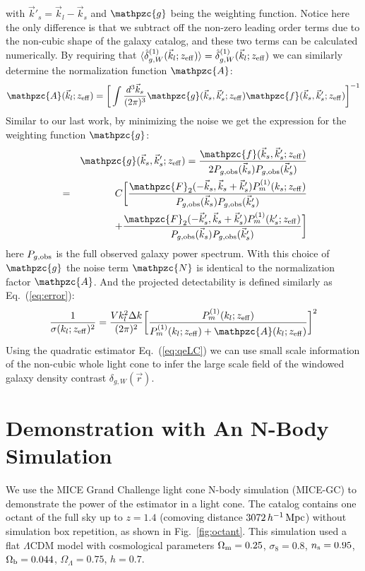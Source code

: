 \documentclass[prd,amsmath,amssymb,floatfix,superscriptaddress,nofootinbib,twocolumn]{revtex4-1}
\newcommand{\vrr}{\vec{r}}
\newcommand{\vs}{\nonumber\\}
\newcommand{\ec}[1]{Eq.~(\ref{eq:#1})}
\newcommand{\rf}[1]{\ref{fig:#1}}
\begin{document}
with $\vec{k}'_s = \vec{k}_l-\vec{k}_s$ and $\mathpzc{g}$ being the weighting function. Notice here the only difference is that we subtract off the non-zero leading order terms due to the non-cubic shape of the galaxy catalog, and these two terms can be calculated numerically. By requiring that $\langle \hat{\delta}^{(1)}_{g,W}(\vec{k}_l;z_{\rm eff})\rangle = \hat{\delta}^{(1)}_{g,W}(\vec{k}_l;z_{\rm eff})$ we can similarly determine the normalization function $\mathpzc{A}$:
\begin{eqnarray}
\mathpzc{A}(\vec{k}_l;z_{\rm eff})=\bigg[ \int \frac{d^{3}\vec{k}_s}{(2\pi)^3}\mathpzc{g}(\vec{k}_s,\vec{k}'_s;z_{\rm eff})\mathpzc{f}(\vec{k}_s,\vec{k}'_s;z_{\rm eff}) \bigg]^{-1}
\end{eqnarray}
Similar to our last work, by minimizing the noise we get the expression for the weighting function $\mathpzc{g}$:
\begin{eqnarray}
&&\mathpzc{g}(\vec{k}_s,\vec{k}'_s;z_{\rm eff})=\frac{\mathpzc{f}(\vec{k}_s,\vec{k}'_s;z_{\rm eff})}{2P_{g,\rm obs}(\vec{k}_s)P_{g,\rm obs}(\vec{k}'_s)}\vs
&=&C\bigg[\frac{\mathpzc{F}_2(-\vec{k}_s,\vec{k}_s+\vec{k}'_s)P_{m}^{(1)}(k_s;z_{\rm eff})}{P_{g,\rm obs}(\vec{k}_s)P_{g,\rm obs}(\vec{k}'_s)}\vs
&&\, +\frac{\mathpzc{F}_2(-\vec{k}'_s,\vec{k}_s+\vec{k}'_s)P_{m}^{(1)}(k'_s;z_{\rm eff})}{P_{g,\rm obs}(\vec{k}_s)P_{g,\rm obs}(\vec{k}'_s)}\bigg]
\end{eqnarray}
here $P_{g,\rm obs}$ is the full observed galaxy power spectrum. With this choice of $\mathpzc{g}$ the noise term $\mathpzc{N}$ is identical to the normalization factor $\mathpzc{A}$. And the projected detectability is defined similarly as \ec{error}:
\begin{eqnarray}
\frac{1}{\sigma(k_l;z_{\rm eff})^2}=\frac{Vk_l^2\Delta k}{(2\pi)^2}\bigg[\frac{P_{m}^{(1)}(k_l;z_{\rm eff})}{P_{m}^{(1)}(k_l;z_{\rm eff})+\mathpzc{A}(k_l;z_{\rm eff}) }\bigg]^2
\end{eqnarray}
Using the quadratic estimator \ec{qeLC} we can use small scale information of the non-cubic whole light cone to infer the large scale field of the windowed galaxy density contrast $\delta_{g,W}(\vrr)$.

\section{Demonstration with An N-Body Simulation} \label{sec4}
\noindent We use the MICE Grand Challenge light cone N-body simulation (MICE-GC)\cite{Fosalba:2015MI}\cite{Fosalba:2015MII}\cite{Fosalba:2013mra} to demonstrate the power of the estimator in a light cone. The catalog contains one octant of the full sky up to $z = 1.4$ (comoving distance $3072\, h^{-1}\, \rm Mpc$) without simulation box repetition, as shown in Fig.~\rf{octant}. This simulation used a flat $\Lambda$CDM model with cosmological parameters $ \Omega_{\rm m}=0.25$, $\sigma_8 = 0.8$, $n_{\rm s}=0.95$, $\Omega_{\rm b}=0.044$, $\Omega_{\Lambda}=0.75$, $h=0.7$. 
\end{document}
